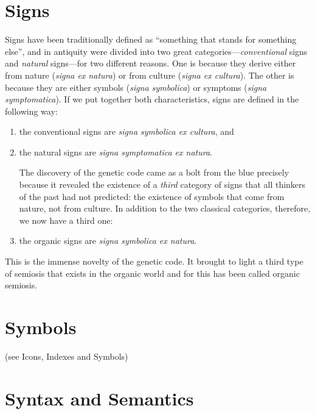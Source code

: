 \documentclass[12pt]{article}
\begin{document}
\section{Signs}
Signs have been traditionally defined as ``something that stands for something else'', and in antiquity were divided into two great categories---\textit{conventional} signs and \textit{natural} signs---for two different reasons. One is because they derive either from nature (\textit{signa ex natura}) or from culture (\textit{signa ex cultura}). The other is because they are either symbols (\textit{signa symbolica}) or symptoms (\textit{signa symptomatica}). If we put together both characteristics, signs are defined in the following way: 
\begin{enumerate}
\item the conventional signs are \textit{signa symbolica ex cultura}, and
\item the natural signs are \textit{signa symptomatica ex natura}.

The discovery of the genetic code came as a bolt from the blue precisely because it revealed the existence of a \textit{third} category of signs that all thinkers of the past had not predicted: the existence of symbols that come from nature, not from culture. In addition to the two classical categories, therefore, we now have a third one:

\item the organic signs are \textit{signa symbolica ex natura}.
\end{enumerate}
This is the immense novelty of the genetic code. It brought to light a third type of semiosis that exists in the organic world and for this has been called organic semiosis.
 

\section{Symbols} (see Icons, Indexes and Symbols)

\hypertarget{syntax_and_semantics}{}
\section{Syntax and Semantics}
\end{document}
